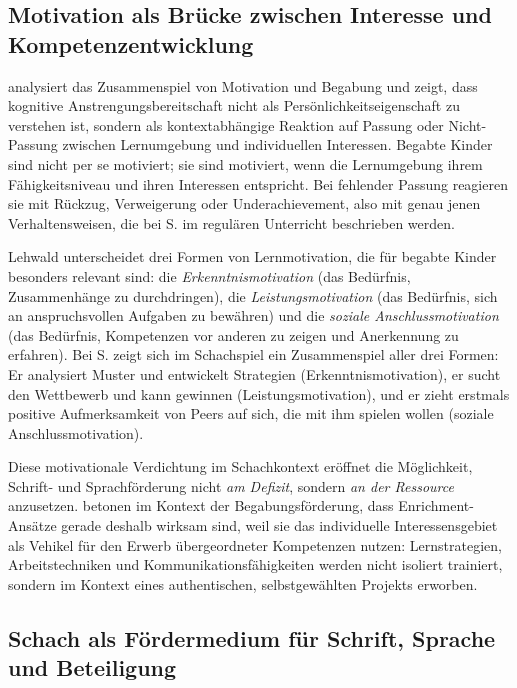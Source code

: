 \documentclass[ngerman, a4paper]{article}
\begin{document}
\subsection{Motivation als Brücke zwischen Interesse und Kompetenzentwicklung}

\textcite{lehwald2017motivation} analysiert das Zusammenspiel von Motivation und Begabung und zeigt, dass
kognitive Anstrengungsbereitschaft nicht als Persönlichkeitseigenschaft zu verstehen ist,
sondern als kontextabhängige Reaktion auf Passung oder Nicht-Passung zwischen
Lernumgebung und individuellen Interessen. Begabte Kinder sind nicht per se motiviert;
sie sind motiviert, wenn die Lernumgebung ihrem Fähigkeitsniveau und ihren Interessen
entspricht. Bei fehlender Passung reagieren sie mit Rückzug, Verweigerung oder
Underachievement, also mit genau jenen Verhaltensweisen, die bei S. im regulären
Unterricht beschrieben werden.

Lehwald unterscheidet drei Formen von Lernmotivation, die für begabte Kinder besonders
relevant sind: die \textit{Erkenntnismotivation} (das Bedürfnis, Zusammenhänge zu
durchdringen), die \textit{Leistungsmotivation} (das Bedürfnis, sich an anspruchsvollen
Aufgaben zu bewähren) und die \textit{soziale Anschlussmotivation} (das Bedürfnis,
Kompetenzen vor anderen zu zeigen und Anerkennung zu erfahren). Bei S. zeigt sich im
Schachspiel ein Zusammenspiel aller drei Formen: Er analysiert Muster und entwickelt
Strategien (Erkenntnismotivation), er sucht den Wettbewerb und kann gewinnen
(Leistungsmotivation), und er zieht erstmals positive Aufmerksamkeit von Peers auf sich,
die mit ihm spielen wollen (soziale Anschlussmotivation).

Diese motivationale Verdichtung im Schachkontext eröffnet die Möglichkeit, Schrift-
und Sprachförderung nicht \textit{am Defizit}, sondern \textit{an der Ressource} anzusetzen.
\textcite{fischer2020begabungsfoerderung} betonen im Kontext der Begabungsförderung, dass Enrichment-Ansätze
gerade deshalb wirksam sind, weil sie das individuelle Interessensgebiet als Vehikel
für den Erwerb übergeordneter Kompetenzen nutzen: Lernstrategien, Arbeitstechniken
und Kommunikationsfähigkeiten werden nicht isoliert trainiert, sondern im Kontext
eines authentischen, selbstgewählten Projekts erworben.

\subsection{Schach als Fördermedium für Schrift, Sprache und Beteiligung}
\end{document}
